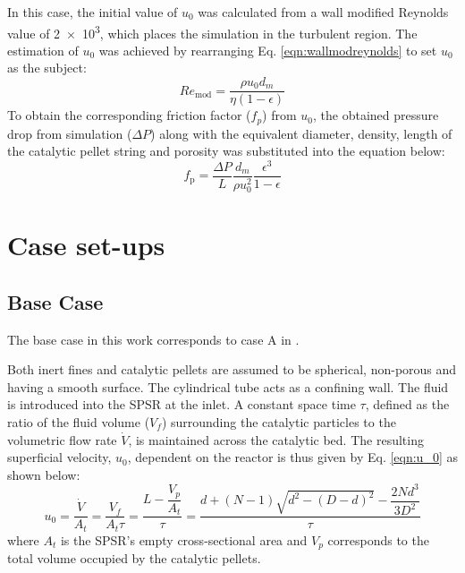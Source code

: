 In this case, the initial value of $u_{0}$ was calculated from a wall modified Reynolds value of \num{2e3}, which places the simulation in the turbulent region. 
The estimation of $u_{0}$ was achieved by rearranging Eq. \ref{eqn:wallmodreynolds} to set $u_{0}$ as the subject:
\begin{equation}\label{eqn:wallmodreynolds}
Re_\text{mod} = \frac{\rho u_0 d_m}{\eta(1-\epsilon)}
\end{equation}
To obtain the corresponding friction factor ($f_p$) from $u_0$, the obtained pressure drop from simulation ($\Delta P$) along with the equivalent diameter, density, length of the catalytic pellet string and porosity was substituted into the equation below:
\begin{equation} \label{eqn:SimulativeFrictionFactor}
f_\text{p} = \frac{\Delta P}{L}\frac{d_m}{\rho u_0^2}\frac{\epsilon^3}{1-\epsilon}
\end{equation}

\section{Case set-ups}
\subsection{Base Case}
The base case in this work corresponds to case A in \cite{Fernengel2020}.

Both inert fines and catalytic pellets are assumed to be spherical, non-porous and having a smooth surface. The cylindrical tube acts as a confining wall. The fluid is introduced into the SPSR at the inlet. 
A constant space time $\tau$, defined as the ratio of the fluid volume ($V_f$) surrounding the catalytic particles to the volumetric flow rate $\dot{V}$, is maintained across the catalytic bed. The resulting superficial velocity, $u_0$, dependent on the reactor is thus given by Eq. \ref{eqn:u_0} as shown below:
\begin{equation}\label{eqn:u_0}
u_0 = \frac{\dot{V}}{A_t} = \frac{V_f}{A_t\tau} = \frac{L-\dfrac{V_p}{A_t}}{\tau} = \frac{d+(N-1)\sqrt{d^2-(D-d)^2}-\dfrac{2Nd^3}{3D^2}}{\tau}
\end{equation}
where $A_t$ is the SPSR's empty cross-sectional area and $V_p$ corresponds to the total volume occupied by the catalytic pellets.

